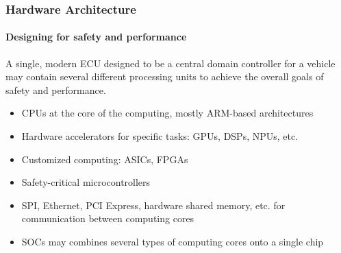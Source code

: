 \begin{frame}
\frametitle{Hardware Architecture}
\framesubtitle{Designing for safety and performance}
A single, modern ECU designed to be a central domain controller for a vehicle
may contain several different processing units to achieve the overall goals
of safety and performance.

\begin{itemize}
    \item CPUs at the core of the computing, mostly ARM-based architectures
    \item Hardware accelerators for specific tasks: GPUs, DSPs, NPUs, etc.
    \item Customized computing: ASICs, FPGAs
    \item Safety-critical microcontrollers
    \item SPI, Ethernet, PCI Express, hardware shared memory, etc. for
        communication between computing cores
    \item SOCs may combines several types of computing cores onto a single chip
\end{itemize}
\end{frame}